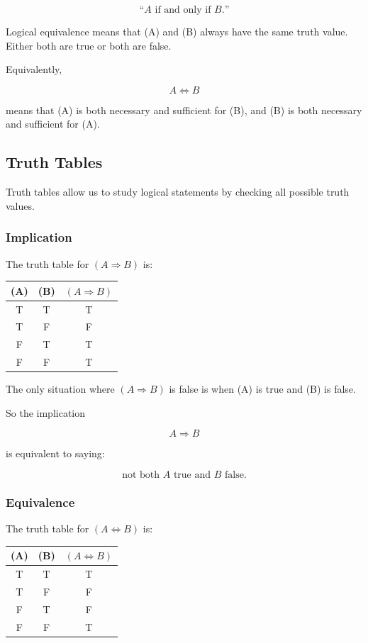 \[
\text{``$A$ if and only if $B$.''}
\]

Logical equivalence means that (A) and (B) always have the same truth value.
Either both are true or both are false.

Equivalently,

\[
A \Leftrightarrow B
\]

means that (A) is both necessary and sufficient for (B), and (B) is both
necessary and sufficient for (A).

\subsection{Truth Tables}

Truth tables allow us to study logical statements by checking all possible truth
values.

\subsubsection{Implication}

The truth table for $(A \Rightarrow B)$ is:

\begin{center}
\begin{tabular}{c|c|c}
(A) & (B) & $(A \Rightarrow B)$ \\
\hline
T & T & T \\
T & F & F \\
F & T & T \\
F & F & T \\
\end{tabular}
\end{center}

The only situation where $(A \Rightarrow B)$ is false is when (A) is true and
(B) is false.

So the implication

\[
A \Rightarrow B
\]

is equivalent to saying:

\[
\text{not both $A$ true and $B$ false.}
\]

\subsubsection{Equivalence}

The truth table for $(A \Leftrightarrow B)$ is:

\begin{center}
\begin{tabular}{c|c|c}
(A) & (B) & $(A \Leftrightarrow B)$ \\
\hline
T & T & T \\
T & F & F \\
F & T & F \\
F & F & T \\
\end{tabular}
\end{center}

